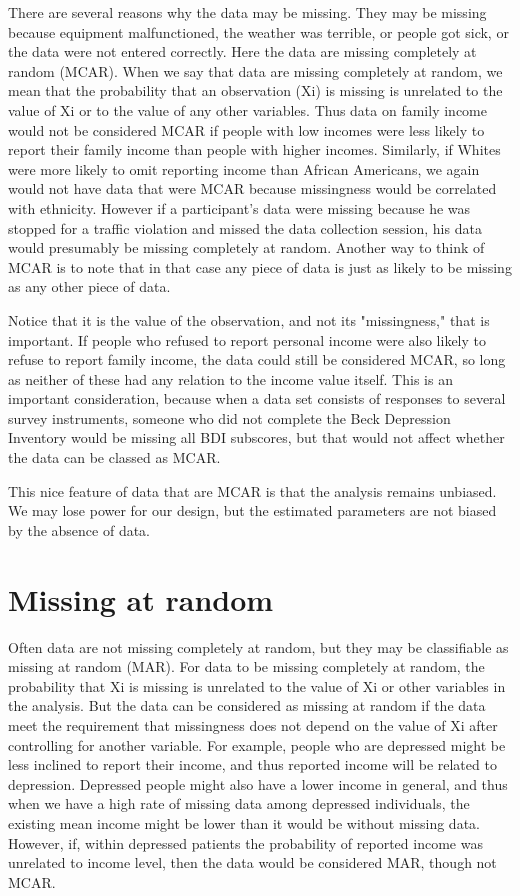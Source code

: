 There are several reasons why the data may be missing. They may be missing because equipment malfunctioned, the weather was terrible, or people got sick, or the data were not entered correctly. Here the data are missing completely at random (MCAR). When we say that data are missing completely at random, we mean that the probability that an observation (Xi) is missing is unrelated to the value of Xi or to the value of any other variables. Thus data on family income would not be considered MCAR if people with low incomes were less likely to report their family income than people with higher incomes. Similarly, if Whites were more likely to omit reporting income than African Americans, we again would not have data that were MCAR because missingness would be correlated with ethnicity. However if a participant's data were missing because he was stopped for a traffic violation and missed the data collection session, his data would presumably be missing completely at random. Another way to think of MCAR is to note that in that case any piece of data is just as likely to be missing as any other piece of data.

Notice that it is the value of the observation, and not its "missingness," that is important. If people who refused to report personal income were also likely to refuse to report family income, the data could still be considered MCAR, so long as neither of these had any relation to the income value itself. This is an important consideration, because when a data set consists of responses to several survey instruments, someone who did not complete the Beck Depression Inventory would be missing all BDI subscores, but that would not affect whether the data can be classed as MCAR. 

This nice feature of data that are MCAR is that the analysis remains unbiased. We may lose power for our design, but the estimated parameters are not biased by the absence of data.


 

\section{Missing at random}



Often data are not missing completely at random, but they may be classifiable as missing at random (MAR). For data to be missing completely at random, the probability that Xi is missing is unrelated to the value of Xi or other variables in the analysis. But the data can be considered as missing at random if the data meet the requirement that missingness does not depend on the value of Xi after controlling for another variable. For example, people who are depressed might be less inclined to report their income, and thus reported income will be related to depression. Depressed people might also have a lower income in general, and thus when we have a high rate of missing data among depressed individuals, the existing mean income might be lower than it would be without missing data. However, if, within depressed patients the probability of reported income was unrelated to income level, then the data would be considered MAR, though not MCAR.

